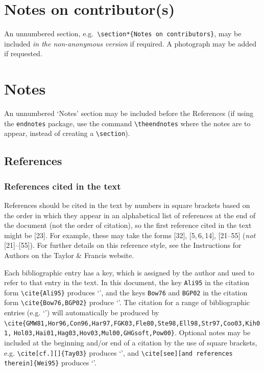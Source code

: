 \documentclass[]{interact}
\theoremstyle{plain}%
\theoremstyle{definition}
\theoremstyle{remark}
\begin{document}
\section*{Notes on contributor(s)}

An unnumbered section, e.g.\ \verb"\section*{Notes on contributors}", may be included \emph{in the non-anonymous version} if required. A photograph may be added if requested.


\section*{Notes}

An unnumbered `Notes' section may be included before the References (if using the \verb"endnotes" package, use the command \verb"\theendnotes" where the notes are to appear, instead of creating a \verb"\section").


\subsection{References}

\subsubsection{References cited in the text}

References should be cited in the text by numbers in square brackets based on the order in which they appear in an alphabetical list of references at the end of the document (not the order of citation), so the first reference cited in the text might be [23]. For example, these may take the forms [32], [5,\,6,\,14], [21--55] (\emph{not} [21]--[55]). For further details on this reference style, see the Instructions for Authors on the Taylor \& Francis website.

Each bibliographic entry has a key, which is assigned by the author and used to refer to that entry in the text. In this document, the key \verb"Ali95" in the citation form \verb"\cite{Ali95}" produces `\cite{Ali95}', and the keys \verb"Bow76" and \verb"BGP02" in the citation form \verb"\cite{Bow76,BGP02}" produce `\cite{Bow76,BGP02}'. The citation for a range of bibliographic entries (e.g. `\cite{GMW81,Hor96,Con96,Har97,FGK03,Fle80,Ste98,Ell98,Str97,Coo03,Kih01,Hol03,Hai01,Hag03,Hov03,Mul00,GHGsoft,Pow00}') will automatically be produced by \verb"\cite{GMW81,Hor96,Con96,Har97,FGK03,Fle80,Ste98,Ell98,Str97,Coo03,Kih01," \verb"Hol03,Hai01,Hag03,Hov03,Mul00,GHGsoft,Pow00}".
Optional notes may be included at the beginning and/or end of a citation by the use of square brackets, e.g. \verb"\cite[cf.][]{Tay03}" produces `\cite[cf.][]{Tay03}', and \verb"\cite[see][and references therein]{Wei95}" produces `\cite[see][and references therein]{Wei95}'.
\end{document}
